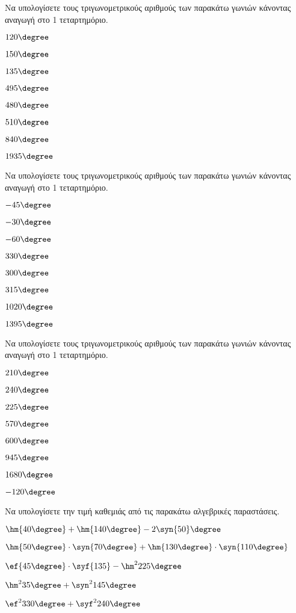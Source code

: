 \begin{multicols}{2}
\Askhsh
Να υπολογίσετε τους τριγωνομετρικούς αριθμούς των παρακάτω γωνιών κάνοντας αναγωγή στο 1 τεταρτημόριο.
\begin{multicols}{4}
\begin{rlist}[leftmargin=5mm]
\item $ 120\degree $
\item $ 150\degree $
\item $ 135\degree $
\item $ 495\degree $
\item $ 480\degree $
\item $ 510\degree $
\item $ 840\degree $
\item $ 1935\degree $
\end{rlist}
\end{multicols}
\Askhsh
Να υπολογίσετε τους τριγωνομετρικούς αριθμούς των παρακάτω γωνιών κάνοντας αναγωγή στο 1 τεταρτημόριο.
\begin{multicols}{4}
\begin{rlist}[leftmargin=5mm]
\item $ -45\degree $
\item $ -30\degree $
\item $ -60\degree $
\item $ 330\degree $
\item $ 300\degree $
\item $ 315\degree $
\item $ 1020\degree $
\item $ 1395\degree $
\end{rlist}
\end{multicols}
\Askhsh
Να υπολογίσετε τους τριγωνομετρικούς αριθμούς των παρακάτω γωνιών κάνοντας αναγωγή στο 1 τεταρτημόριο.
\begin{multicols}{4}
\begin{rlist}[leftmargin=4mm]
\item $ 210\degree $
\item $ 240\degree $
\item $ 225\degree $
\item $ 570\degree $
\item $ 600\degree $
\item $ 945\degree $
\item $ 1680\degree $
\item $ -120\degree $
\end{rlist}
\end{multicols}
\Askhsh
Να υπολογίσετε την τιμή καθεμιάς από τις παρακάτω αλγεβρικές παραστάσεις.
\begin{rlist}
\item $ \hm{40\degree}+\hm{140\degree}-2\syn{50}\degree $
\item $ \hm{50\degree}\cdot\syn{70\degree}+\hm{130\degree}\cdot\syn{110\degree} $
\item $ \ef{45\degree}\cdot \syf{135}-\hm^2{225\degree} $
\item $ \hm^2{35\degree}+\syn^2{145\degree} $
\item $ \ef^2{330\degree}+\syf^2{240\degree} $
\end{rlist}
\end{multicols}
